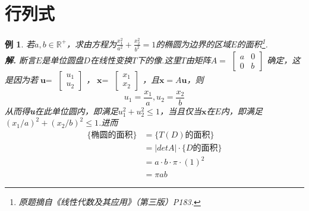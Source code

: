 \documentclass[UTF8,11pt]{ctexart}
\newtheorem{example}{例}
\begin{document}
	\section{行列式}
		\begin{example}
			若$a,b\in\mathbb{R}^+$，求由方程为$\frac{x_1^2}{a^2}+\frac{x_2^2}{b^2}=1$的椭圆为边界的区域$E$的面积\footnote{原题摘自《线性代数及其应用》（第三版）P183.}.\\
			\textbf{解. }断言$E$是单位圆盘$D$在线性变换$T$下的像.这里$T$由矩阵$A=$
			$\begin{bmatrix}
				a & 0\\
				0 & b
			\end{bmatrix}$
			确定，这是因为若$\textbf{u}=$
			$\begin{bmatrix}
				u_1 \\
				u_2
			\end{bmatrix}$
			，$\textbf{x}=$
			$\begin{bmatrix}
				x_1 \\
				x_2
			\end{bmatrix}$
			，且$\textbf{x}=A\textbf{u}$，则
			\[u_1=\frac{x_1}{a} , u_2=\frac{x_2}{b}\]
			从而得\textbf{u}在此单位圆内，即满足$u_1^2+u_2^2\le1$，当且仅当$\textbf{x}$在$E$内，即满足$(x_1/a)^2+(x_2/b)^2\le1$.进而
			\begin{align*}
				\{\text{椭圆的面积}\}& =\{T(D)\text{的面积}\}\\
											 & =|det A|\cdot\{D\text{的面积}\}\\
											 & =a \cdot b \cdot \pi \cdot (1)^2\\
											 & =\pi ab
			\end{align*}
		\end{example}
	
	
\end{document}
